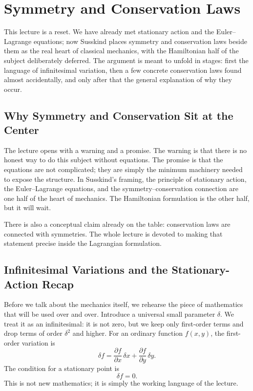 \chapter{Symmetry and Conservation Laws}

This lecture is a reset. We have already met stationary action and the Euler--Lagrange equations; now Susskind places symmetry and conservation laws beside them as the real heart of classical mechanics, with the Hamiltonian half of the subject deliberately deferred. The argument is meant to unfold in stages: first the language of infinitesimal variation, then a few concrete conservation laws found almost accidentally, and only after that the general explanation of why they occur.

\section{Why Symmetry and Conservation Sit at the Center}

The lecture opens with a warning and a promise. The warning is that there is no honest way to do this subject without equations. The promise is that the equations are not complicated; they are simply the minimum machinery needed to expose the structure. In Susskind's framing, the principle of stationary action, the Euler--Lagrange equations, and the symmetry--conservation connection are one half of the heart of mechanics. The Hamiltonian formulation is the other half, but it will wait.

There is also a conceptual claim already on the table: conservation laws are connected with symmetries. The whole lecture is devoted to making that statement precise inside the Lagrangian formulation.

\section{Infinitesimal Variations and the Stationary-Action Recap}

Before we talk about the mechanics itself, we rehearse the piece of mathematics that will be used over and over. Introduce a universal small parameter \(\delta\). We treat it as an infinitesimal: it is not zero, but we keep only first-order terms and drop terms of order \(\delta^2\) and higher. For an ordinary function \(f(x,y)\), the first-order variation is
\begin{equation}
\delta f
=
\frac{\partial f}{\partial x}\,\delta x
+
\frac{\partial f}{\partial y}\,\delta y.
\end{equation}
The condition for a stationary point is
\begin{equation}
\delta f=0.
\end{equation}
This is not new mathematics; it is simply the working language of the lecture.

